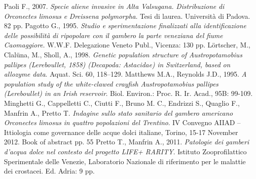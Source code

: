 \documentclass[10pt,twoside,openany,x11names,svgnames,italian,a5paper,dvipsnames,table]{memoir}
\newcommand{\backgroundrectanglecolor}{Azure!60!white}
\begin{document}
\begin{thebibliography}{9}
 Paoli F., 2007. \emph{Specie aliene invasive in Alta Valsugana. Distribuzione di \emph{Orconectes limosus} e \emph{Dreissena polymorpha}}. Tesi di laurea. Università di Padova. 82 pp. 
 Pagotto G., 1995. \emph{Studio e sperimentazione finalizzati alla identificazione delle possibilità di ripopolare con il gambero la parte veneziana del fiume Caomaggiore}. W.W.F. Delegazione Veneto Publ., Vicenza: 130 pp.
 Lörtscher, M., Clalüna, M., Sholl, A., 1998. \emph{Genetic population structure of \emph{Austropotamobius pallipes} (Lereboullet, 1858) (\emph{Decapoda}: \emph{Astacidae}) in Switzerland, based on allozyme data}. Aquat. Sci. 60, 118–129.
 Matthews M.A., Reynolds J.D., 1995. \emph{A population study of the white-clawed crayfish \emph{Austropotamobius pallipes} (Lereboullet) in an Irish reservoir}. Biol. Environ.: Proc. R. Ir. Acad., 95B: 99-109.
 Minghetti G., Cappelletti C., Ciutti F., Bruno M. C., Endrizzi S., Quaglio F., Manfrin A., Pretto T. \emph{Indagine sullo stato sanitario del gambero americano \emph{Orconectes limosus} in quattro popolazioni del Trentino}. IV Convegno AIIAD – Ittiologia come governance delle acque dolci italiane, Torino, 15-17 November 2012. Book of abstract pp. 55
 Pretto T., Manfrin A., 2011. \emph{Patologie dei gamberi d’acqua dolce nel contesto del progetto LIFE+ RARITY}. Istituto Zooprofilattico Sperimentale delle Venezie, Laboratorio Nazionale di riferimento per le malattie dei crostacei. Ed. Adria: 9 pp. 






\end{thebibliography}
\end{document}
